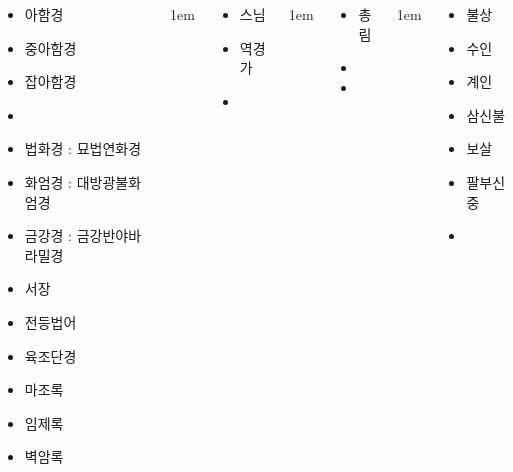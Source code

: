 \documentclass[	20pt, 
							a0paper, 
							landscape,
							margin=0mm, %
							innermargin=10mm,  		%
							blockverticalspace=4mm, %
							colspace=5mm, 
							subcolspace=0mm
							]{tikzposter}
\begin{document}
\begin{columns}
{\begin{LARGE}
\begin{itemize}
					\item 아함경
					\item 중아함경
					\item 잡아함경
					\item 


					\item 법화경 : 묘법연화경
					\item 화엄경 : 대방광불화엄경 
					\item 금강경 : 금강반야바라밀경
					\item 서장
					\item 전등법어
					\item  육조단경
					\item  마조록
					\item  임제록
					\item  벽암록
					\end{itemize}
				\end{LARGE}
			} %

			{
					\setlength{\leftmargini}{4em}
					\setlength{\labelsep} {1em}
				\begin{LARGE}
					\begin{itemize}
					\item 스님
					\item 역경가
					\item 
					\end{itemize}
				\end{LARGE}
			} %


			{
					\setlength{\leftmargini}{4em}
					\setlength{\labelsep} {1em}
				\begin{LARGE}
					\begin{itemize}
					\item 총림
					\item 
					\item 
					\end{itemize}
				\end{LARGE}
			} %




			{
					\setlength{\leftmargini}{4em}
					\setlength{\labelsep} {1em}
				\begin{LARGE}
					\begin{itemize}
					\item 불상 
					\item 수인
					\item 계인
					\item 삼신불
					\item 보살
					\item 팔부신중
					\item 


\end{itemize}
\end{LARGE}}
\end{columns}
\end{document}
